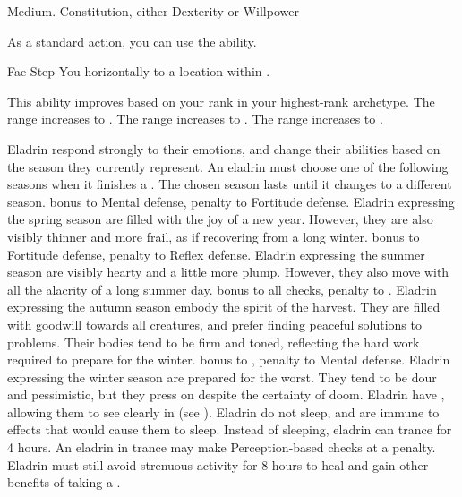          Medium.
          Constitution, either  Dexterity or  Willpower
        \begin{raggeditemize}
             As a standard action, you can use the  ability.
            \begin{magicalactiveability}{Fae Step}
                \rankline
                You  horizontally to a location within \shortrange.

                \rankline
                This ability improves based on your rank in your highest-rank archetype.
                 The range increases to \medrange.
                 The range increases to \longrange.
                 The range increases to \distrange.
            \end{magicalactiveability}
             Eladrin respond strongly to their emotions, and change their abilities based on the season they currently represent.
                An eladrin must choose one of the following seasons when it finishes a .
                The chosen season lasts until it changes to a different season.
                  bonus to Mental defense,  penalty to Fortitude defense.
                Eladrin expressing the spring season are filled with the joy of a new year.
                However, they are also visibly thinner and more frail, as if recovering from a long winter.
                  bonus to Fortitude defense,  penalty to Reflex defense.
                Eladrin expressing the summer season are visibly hearty and a little more plump.
                However, they also move with all the alacrity of a long summer day.
                  bonus to all checks,  penalty to .
                Eladrin expressing the autumn season embody the spirit of the harvest.
                They are filled with goodwill towards all creatures, and prefer finding peaceful solutions to problems.
                Their bodies tend to be firm and toned, reflecting the hard work required to prepare for the winter.
                  bonus to ,  penalty to Mental defense.
                Eladrin expressing the winter season are prepared for the worst.
                They tend to be dour and pessimistic, but they press on despite the certainty of doom.
             Eladrin have , allowing them to see clearly in  (see ).
             Eladrin do not sleep, and are immune to \magical effects that would cause them to sleep.
                Instead of sleeping, eladrin can trance for 4 hours.
                An eladrin in trance may make Perception-based checks at a  penalty.
                Eladrin must still avoid strenuous activity for 8 hours to heal and gain other benefits of taking a .
        \end{raggeditemize}
